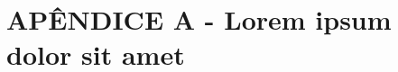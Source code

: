 
\onehalfspacing 

\appendix

\def\@makeschapterhead#1{
	\pagestyle{myheadings}
	\begin{center}
		\textbf{#1}\par
	\end{center}
	\vspace{1.5\baselineskip}
	\setcounter{secnumdepth}{1} %
	\setcounter{tocdepth}{1}    %
}



\chapter*{APÊNDICE A - Lorem ipsum dolor sit amet}

	\renewcommand{\theintro}{A}
	\label{app:A}

